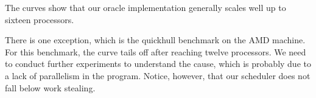 The curves show that our oracle implementation generally scales
well up to sixteen processors.

There is one exception, which is the quickhull benchmark on the AMD
machine. For this benchmark, the curve tails off after reaching twelve
processors. We need to conduct further experiments to understand the
cause, which is probably due to a lack of parallelism in the program.
Notice, however, that our scheduler does not fall below work stealing.






